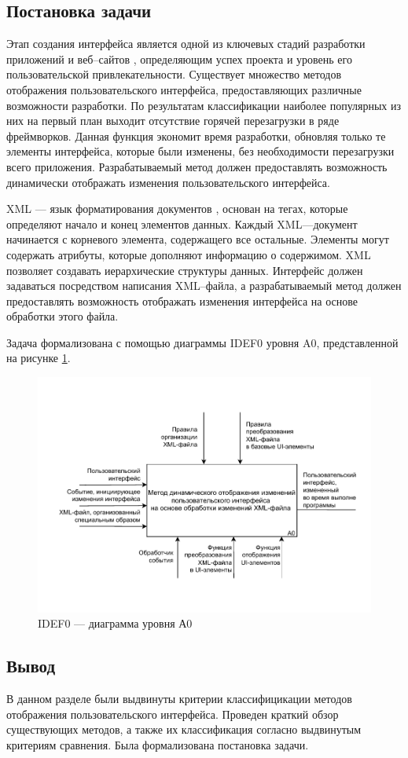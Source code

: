 \subsection{Постановка задачи}

Этап создания интерфейса является одной из ключевых стадий разработки приложений и веб--сайтов \cite{website}, определяющим успех проекта и уровень его пользовательской привлекательности. 
Существует множество методов отображения пользовательского интерфейса, предоставляющих различные возможности разработки. 
По результатам классификации наиболее популярных из них на первый план выходит отсутствие горячей перезагрузки в ряде фреймворков.
Данная функция экономит время разработки, обновляя только те элементы интерфейса, которые были изменены, без необходимости перезагрузки всего приложения. 
Разрабатываемый метод должен предоставлять возможность динамически отображать изменения пользовательского интерфейса.

XML --- язык форматирования документов \cite{xml}, основан на тегах, которые определяют начало и конец элементов данных.
Каждый XML---документ начинается с корневого элемента, содержащего все остальные. 
Элементы могут содержать атрибуты, которые дополняют информацию о содержимом. 
XML позволяет создавать иерархические структуры данных.
Интерфейс должен задаваться посредством написания XML--файла, а разрабатываемый метод должен предоставлять возможность отображать изменения интерфейса на основе обработки этого файла.

Задача формализована с помощью диаграммы IDEF0 уровня A0, представленной на рисунке  \ref{fig:idef0}.

\begin{figure}[!htb]
	\centering
	\includegraphics[scale=1]{img/A0.pdf}
	\caption{IDEF0 --- диаграмма уровня А0}
	\label{fig:idef0}
\end{figure}

\newpage{}
\subsection*{Вывод}

В данном разделе были выдвинуты критерии классифицикации методов отображения пользовательского интерфейса.
Проведен краткий обзор существующих методов, а также их классификация согласно выдвинутым критериям сравнения. 
Была формализована постановка задачи.

\pagebreak
